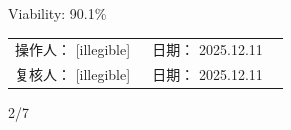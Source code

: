 \documentclass[UTF8,10pt,a4paper,fontset=fandol]{ctexart}
\newcommand{\fieldvalue}[1]{#1}
\newcommand{\handwritten}[1]{#1}
\begin{document}
\medskip
\noindent
Viability:
\fieldvalue{90.1\%}

\bigskip

\noindent
\begin{tabular}{@{}p{0.47\linewidth}p{0.47\linewidth}@{}}
操作人：
\fieldvalue{\handwritten{[illegible]}}
&
日期：
\fieldvalue{\handwritten{2025.12.11}}
\\[1.5em]
复核人：
\fieldvalue{\handwritten{[illegible]}}
&
日期：
\fieldvalue{\handwritten{2025.12.11}}
\end{tabular}

\bigskip

\hfill
\handwritten{2/7}

\medskip

\noindent
\begin{minipage}[t]{0.40\linewidth}
\centering
\end{minipage}
\hfill
\begin{minipage}[t]{0.40\linewidth}
\centering
\end{minipage}

\medskip

\noindent
\begin{minipage}[t]{0.40\linewidth}
\centering
\end{minipage}
\hfill
\begin{minipage}[t]{0.40\linewidth}
\centering
\end{minipage}
\end{document}
